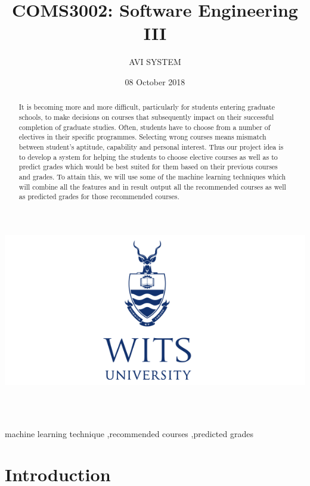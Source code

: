 \documentclass[10pt]{article}
\author{AVI SYSTEM }
\title {COMS3002: Software Engineering III}
\date{ 08 October 2018}
\begin{document}
\maketitle


\begin{center}
\includegraphics[width=1.1\textwidth]{wits1.png}
\end{center} \\ \\

\newpage

\tableofcontents

\newpage

\begin{abstract}
It is becoming more and more difficult, particularly for students entering graduate schools, to make decisions
on courses that\label{Chapter1}  subsequently impact on their successful completion of graduate studies. Often, students have
to choose from a number of electives in their specific programmes. Selecting wrong courses means mismatch between student’s
aptitude, capability and personal interest. Thus our project idea is to develop a system for helping the students to choose elective courses as well as to predict grades which would be best suited for them based on their previous courses and grades. To attain this, we will use some of the machine learning techniques which will combine all the features and in result output all the recommended courses as well as predicted grades for those recommended courses.
\end{abstract}
\begin{keyword}
machine learning technique \sep recommended courses \sep predicted grades
\end{keyword}


\section{Introduction}
\label{Chapter1} 
\end{document}
